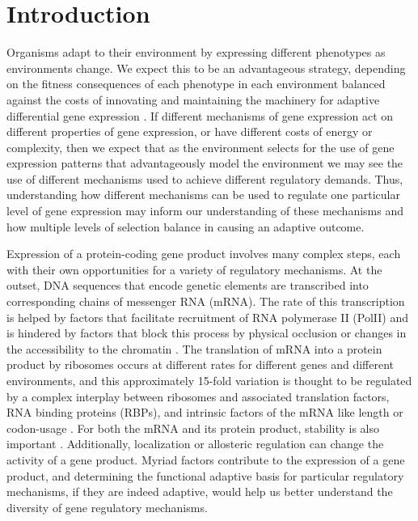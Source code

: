 \chapter{Introduction}

Organisms adapt to their environment 
by expressing different phenotypes 
as environments change. 
We expect this to be an advantageous strategy, 
depending on the fitness consequences of 
each phenotype in each environment 
balanced against the costs of innovating and maintaining
the machinery for adaptive differential gene expression
\parencite{kussell2005phenotypic}. 
If different mechanisms of gene expression act on different properties
of gene expression, or have different costs of energy or complexity, 
then we expect that as the environment selects for the use of 
gene expression patterns that advantageously model the environment
\parencite{tagkopoulos2008predictive} we may see the use of different
mechanisms used to achieve different regulatory demands.
Thus, understanding how different mechanisms can be used to
regulate one particular level of gene expression may inform our 
understanding of these mechanisms and how multiple levels of selection 
balance in causing an adaptive outcome.

Expression of a protein-coding gene
product involves many complex steps, each with their own opportunities
for a variety of regulatory mechanisms. At the outset, DNA sequences
that encode genetic elements are transcribed into corresponding chains
of messenger RNA (mRNA). The rate of this transcription is helped by
factors that facilitate recruitment of RNA polymerase II (PolII)
and is hindered by factors that block this process by physical
occlusion or changes in the accessibility to the chromatin 
\parencite{hahn2011transcriptional}. 
The translation of mRNA into a protein product by
ribosomes occurs at different rates for different genes and different
environments, and this approximately 15-fold variation 
\parencite{weinberg2016improved} is thought to be 
regulated by a complex interplay between ribosomes and
associated translation factors, RNA binding proteins (RBPs), and
intrinsic factors of the mRNA like length or codon-usage 
\parencite{dever2016mechanism}.
For both the mRNA and its protein product, stability is also
important \parencite{perez2013eukaryotic,mcmanus2015next}. 
Additionally, localization or allosteric regulation can change
the activity of a gene product. Myriad factors contribute to the
expression of a gene product, and determining the functional adaptive
basis for particular regulatory mechanisms, if they are indeed
adaptive, would help us better understand the diversity of gene
regulatory mechanisms.

